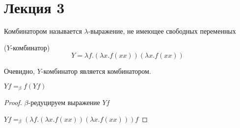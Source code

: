\section{Лекция 3}
\begin{definition}
	Комбинатором называется $\lambda$-выражение, не имеющее свободных переменных
\end{definition}

\begin{definition}($Y$-комбинатор)
	\[
	Y = \lambda f . (\lambda x . f (x x)) (\lambda x . f (x x))
	\]
\end{definition}

Очевидно, $Y$-комбинатор является комбинатором.

\begin{theorem}
	$Y f =_{\beta} f (Y f)$
	
	\begin{proof}
		$\beta$-редуцируем выражение $Y f$
		
		$Y f =_{\beta} (\lambda f . (\lambda x . f (x x)) (\lambda x . f (x x))) f$
	\end{proof}
\end{theorem}